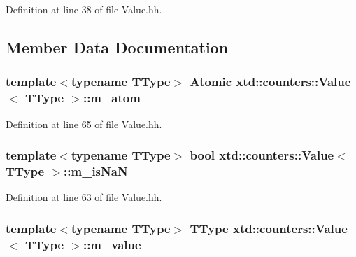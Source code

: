 Definition at line 38 of file Value.\+hh.



\subsection{Member Data Documentation}
\subsubsection[{\texorpdfstring{m\+\_\+atom}{m_atom}}]{\setlength{\rightskip}{0pt plus 5cm}template$<$typename T\+Type$>$ {\bf Atomic} {\bf xtd\+::counters\+::\+Value}$<$ T\+Type $>$\+::m\+\_\+atom\hspace{0.3cm}{\ttfamily [protected]}}\hypertarget{classxtd_1_1counters_1_1Value_a0cf45c8f82588321af127529ba4f214a}{}\label{classxtd_1_1counters_1_1Value_a0cf45c8f82588321af127529ba4f214a}


Definition at line 65 of file Value.\+hh.

\subsubsection[{\texorpdfstring{m\+\_\+is\+NaN}{m_isNaN}}]{\setlength{\rightskip}{0pt plus 5cm}template$<$typename T\+Type$>$ bool {\bf xtd\+::counters\+::\+Value}$<$ T\+Type $>$\+::m\+\_\+is\+NaN\hspace{0.3cm}{\ttfamily [protected]}}\hypertarget{classxtd_1_1counters_1_1Value_a28be66961121bb488351e2c2722fd18a}{}\label{classxtd_1_1counters_1_1Value_a28be66961121bb488351e2c2722fd18a}


Definition at line 63 of file Value.\+hh.

\subsubsection[{\texorpdfstring{m\+\_\+value}{m_value}}]{\setlength{\rightskip}{0pt plus 5cm}template$<$typename T\+Type$>$ T\+Type {\bf xtd\+::counters\+::\+Value}$<$ T\+Type $>$\+::m\+\_\+value\hspace{0.3cm}{\ttfamily [protected]}}\hypertarget{classxtd_1_1counters_1_1Value_abe06c1cebededaf2f216707171f63c3c}{}\label{classxtd_1_1counters_1_1Value_abe06c1cebededaf2f216707171f63c3c}


